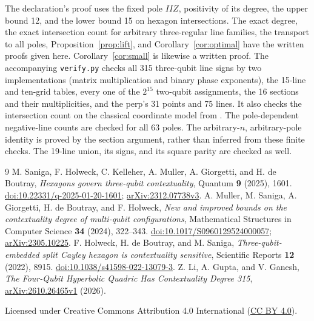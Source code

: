 \documentclass[10pt]{article}
\begin{document}
The declaration's proof uses the fixed pole $IIZ$, positivity of its degree,
the upper bound 12, and the lower bound 15 on hexagon intersections.
The exact degree, the exact intersection count for arbitrary three-regular
line families, the transport to all poles, Proposition~\ref{prop:lift}, and
Corollary~\ref{cor:optimal} have the written proofs given here.
Corollary~\ref{cor:small} is likewise a written proof.
The accompanying \texttt{verify.py} checks all 315 three-qubit line signs by
two implementations (matrix multiplication and binary phase exponents), the
15-line and ten-grid tables, every one of the $2^{15}$ two-qubit assignments,
the 16 sections and their multiplicities, and the perp's 31 points and 75 lines.
It also checks the intersection count on the classical coordinate model from
\cite[equations~(13)--(14)]{saniga}.
The pole-dependent negative-line counts are checked for all 63 poles.
The arbitrary-$n$, arbitrary-pole identity is proved by
the section argument, rather than inferred from these finite checks.
The 19-line union, its signs, and its square parity are checked as well.

\begin{thebibliography}{9}
M. Saniga, F. Holweck, C. Kelleher, A. Muller, A. Giorgetti, and H. de Boutray,
\emph{Hexagons govern three-qubit contextuality}, Quantum \textbf{9} (2025), 1601.
\href{https://doi.org/10.22331/q-2025-01-20-1601}{doi:10.22331/q-2025-01-20-1601};
\href{https://arxiv.org/abs/2312.07738v3}{arXiv:2312.07738v3}.
A. Muller, M. Saniga, A. Giorgetti, H. de Boutray, and F. Holweck,
\emph{New and improved bounds on the contextuality degree of multi-qubit configurations},
Mathematical Structures in Computer Science \textbf{34} (2024), 322--343.
\href{https://doi.org/10.1017/S0960129524000057}{doi:10.1017/S0960129524000057};
\href{https://arxiv.org/abs/2305.10225}{arXiv:2305.10225}.
F. Holweck, H. de Boutray, and M. Saniga,
\emph{Three-qubit-embedded split Cayley hexagon is contextuality sensitive},
Scientific Reports \textbf{12} (2022), 8915.
\href{https://doi.org/10.1038/s41598-022-13079-3}{doi:10.1038/s41598-022-13079-3}.
Z. Li, A. Gupta, and V. Ganesh,
\emph{The Four-Qubit Hyperbolic Quadric Has Contextuality Degree 315},
\href{https://arxiv.org/abs/2610.26465v1}{arXiv:2610.26465v1} (2026).
\end{thebibliography}
\enlargethispage{2\baselineskip}
\medskip
\noindent\small Licensed under Creative Commons Attribution 4.0 International
(\href{https://creativecommons.org/licenses/by/4.0/}{CC BY 4.0}).
\end{document}
